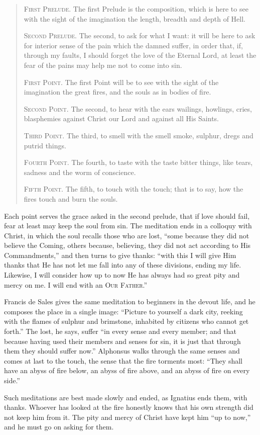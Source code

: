 \begin{quote}
\textsc{First Prelude.} The first Prelude is the composition, which is here to see with the sight of the imagination the length, breadth and depth of Hell.

\textsc{Second Prelude.} The second, to ask for what I want: it will be here to ask for interior sense of the pain which the damned suffer, in order that, if, through my faults, I should forget the love of the Eternal Lord, at least the fear of the pains may help me not to come into sin.

\textsc{First Point.} The first Point will be to see with the sight of the imagination the great fires, and the souls as in bodies of fire.

\textsc{Second Point.} The second, to hear with the ears wailings, howlings, cries, blasphemies against Christ our Lord and against all His Saints.

\textsc{Third Point.} The third, to smell with the smell smoke, sulphur, dregs and putrid things.

\textsc{Fourth Point.} The fourth, to taste with the taste bitter things, like tears, sadness and the worm of conscience.

\textsc{Fifth Point.} The fifth, to touch with the touch; that is to say, how the fires touch and burn the souls.
\end{quote}

Each point serves the grace asked in the second prelude, that if love should fail, fear at least may keep the soul from sin. The meditation ends in a colloquy with Christ, in which the soul recalls those who are lost, ``some because they did not believe the Coming, others because, believing, they did not act according to His Commandments,'' and then turns to give thanks: ``with this I will give Him thanks that He has not let me fall into any of these divisions, ending my life. Likewise, I will consider how up to now He has always had so great pity and mercy on me. I will end with an \textsc{Our Father}.''

Francis de Sales gives the same meditation to beginners in the devout life, and he composes the place in a single image: ``Picture to yourself a dark city, reeking with the flames of sulphur and brimstone, inhabited by citizens who cannot get forth.'' The lost, he says, suffer ``in every sense and every member; and that because having used their members and senses for sin, it is just that through them they should suffer now.'' Alphonsus walks through the same senses and comes at last to the touch, the sense that the fire torments most: ``They shall have an abyss of fire below, an abyss of fire above, and an abyss of fire on every side.''

Such meditations are best made slowly and ended, as Ignatius ends them, with thanks. Whoever has looked at the fire honestly knows that his own strength did not keep him from it. The pity and mercy of Christ have kept him ``up to now,'' and he must go on asking for them.
